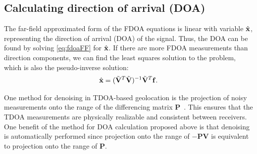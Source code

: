\subsection{Calculating direction of arrival (DOA)}
The far-field approximated form of the FDOA equations is linear with variable $\hat{\mathbf{x}}$, representing the direction of arrival (DOA) of the signal. Thus, the DOA can be found by solving \eqref{eq:fdoaFF} for $\hat{\mathbf{x}}$. If there are more FDOA measurements than direction components, we can find the least squares solution to the problem, which is also the pseudo-inverse solution:
\begin{align}
  \label{eq:doa}
\hat{\mathbf{x}} = (\tilde{\mathbf{V}}^T\tilde{\mathbf{V}})^{-1}\tilde{\mathbf{V}}^T\mathbf{f}.
\end{align}

One method for denoising in TDOA-based geolocation is the projection of noisy measurements onto the range of the differencing matrix $\mathbf{P}$~\cite{Schmidt1996,Compagnoni2017}. This ensures that the TDOA measurements are physically realizable and consistent between receivers. One benefit of the method for DOA calculation proposed above is that denoising is automatically performed since projection onto the range of $\mathbf{-PV}$ is equivalent to projection onto the range of $\mathbf{P}$.

